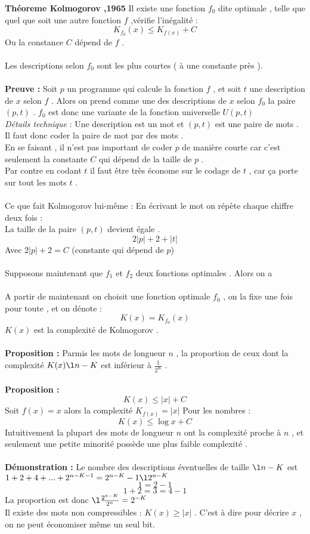 \documentclass[base.tex]{subfiles}
\begin{document}
\textbf{Théoreme  Kolmogorov ,1965}
Il existe une fonction $f_0$ dite optimale , telle que quel que soit une autre fonction $f$ ,vérifie l'inégalité :
\[K_{f_0}(x) \le K_{f(x)} + C\]
Ou la constance $C$ dépend de $f$ .\\
\\
Les descriptions selon $f_0$ sont les plus courtes ( à une constante près ).
\\
\\
\textbf{Preuve : } Soit $p$ un programme qui calcule la fonction $f$ , et soit $t$ une description de $x$ selon $f$ . Alors on prend comme une des descriptions de $x$ selon $f_0$ la paire $(p,t)$ . $f_0$ est donc une variante de la fonction universelle $U(p,t)$\\
\textit{Détails technique} : Une description est un mot et $(p,t)$ est une paire de mots . Il faut donc coder la paire de mot par des mots .\\
En se faisant , il n'est pas important de coder $p$ de manière courte car c'est seulement la constante $C$ qui dépend de la taille de $p$ .\\
Par contre en codant $t$ il faut être très économe sur le codage de $t$ , car ça porte sur tout les mots $t$ .\\
\\
Ce que fait Kolmogorov lui-même : En écrivant le mot on répète chaque chiffre deux fois :
\\
La taille de la paire $(p,t)$ devient égale .
\[2|p| + 2 + |t|\]
Avec $2|p| + 2 = C$ (constante qui dépend de $p$)
\\
\\
Supposons maintenant que $f_1$ et $f_2$ deux fonctions optimales . Alors on a
\\
\\
A partir de maintenant on choisit une fonction optimale $f_0$ , on la fixe une fois pour toute , et on dénote :
\[K(x) = K_{f_0}(x)\]
$K(x)$ est la complexité de Kolmogorov .
\\
\\
\textbf{Proposition : } Parmis les mots de longueur $n$ , la proportion de ceux dont la complexité $K(x) \l n-K$ est inférieur à $\frac{1}{2^K}$ .\\
\\
\textbf{Proposition :}
\[K(x) \le |x| + C\]
Soit $f(x) = x$ alors la complexité $K_{f(x)} = |x|$
Pour les nombres :
\[K(x) \le \log x + C\]
Intuitivement la plupart des mots de longueur $n$ ont la complexité proche à $n$ , et seulement une petite minorité possède une plus faible complexité .
\\
\\
\textbf{Démonstration : } Le nombre des descriptions éventuelles de taille $\l n-K$ est $1+2+4+...+2^{n-K-1} = 2^{n-K} - 1 \l 2^{n-K}$
\[1=2-1\]
\[1+2 = 3 = 4-1 \]
La proportion est donc $ \l \frac{2^{n-K}}{2^n} = 2^{-K}$\\
Il existe des mots non compressibles : $K(x) \geq |x|$ . C'est à dire pour décrire $x$ , on ne peut économiser même un seul bit.\\
\end{document}
